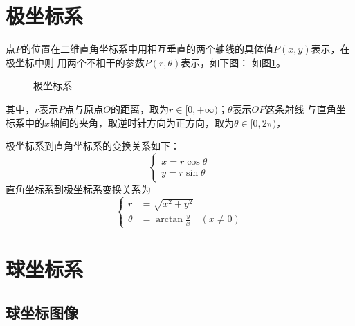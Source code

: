 \section{极坐标系\label{section:reference-polar}}
点$P$的位置在二维直角坐标系中用相互垂直的两个轴线的具体值$P(x, y)$表示，在极坐标中则
用两个不相干的参数$P(r, \theta)$表示，如下图：
如图\ref{fig:PolarCoord}。
\begin{figure}[ht]
    \centering
    \setlength{\abovecaptionskip}{0.2cm}
    
    \caption{极坐标系}
    \label{fig:PolarCoord}
\end{figure}
其中，$r$表示$P$点与原点$O$的距离，取为$r\in [0, +\infty)$；$\theta$表示$OP$这条射线
与直角坐标系中的$x$轴间的夹角，取逆时针方向为正方向，取为$\theta \in [0, 2\pi)$，

极坐标系到直角坐标系的变换关系如下：
\begin{equation}
    \begin{cases}
        x = r \cos \theta   \\
        y = r \sin \theta
    \end{cases}
    \label{eq:polar-cartesian}
\end{equation}
直角坐标系到极坐标系变换关系为
\begin{equation}
    \begin{cases}
             r &= \sqrt{x^2 + y^2}   \\
        \theta &= \arctan \frac{y}{x} \quad (x \neq 0)
    \end{cases}
    \label{eq:cartesian-polar}
\end{equation}

\section{球坐标系}

\subsection{球坐标图像}
